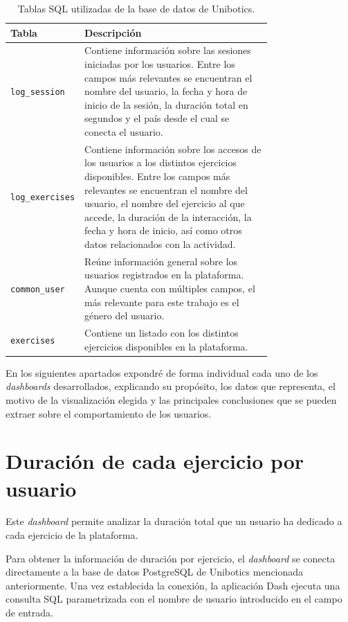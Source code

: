 \documentclass[a4paper, 12pt]{book}
\begin{document}
\begin{table}[!htb]
\centering
\caption{Tablas SQL utilizadas de la base de datos de Unibotics.}
\label{tbl:sql-tables}
\begin{tabular}{lp{0.75\linewidth}}
\toprule
\textbf{Tabla} & \textbf{Descripción} \\
\midrule
\texttt{log\_session} & Contiene información sobre las sesiones iniciadas por los usuarios. Entre los campos más relevantes se encuentran el nombre del usuario, la fecha y hora de inicio de la sesión, la duración total en segundos y el país desde el cual se conecta el usuario. \\
\texttt{log\_exercises} & Contiene información sobre los accesos de los usuarios a los distintos ejercicios disponibles. Entre los campos más relevantes se encuentran el nombre del usuario, el nombre del ejercicio al que accede, la duración de la interacción, la fecha y hora de inicio, así como otros datos relacionados con la actividad. \\
\texttt{common\_user} & Reúne información general sobre los usuarios registrados en la plataforma. Aunque cuenta con múltiples campos, el más relevante para este trabajo es el género del usuario. \\
\texttt{exercises} & Contiene un listado con los distintos ejercicios disponibles en la plataforma. \\
\bottomrule
\end{tabular}
\vspace{1ex}
\end{table}

En los siguientes apartados expondré de forma individual cada uno de los \textit{dashboards} desarrollados, explicando su propósito, los datos que representa, el motivo de la visualización elegida y las principales conclusiones que se pueden extraer sobre el comportamiento de los usuarios.

\section{Duración de cada ejercicio por usuario}
\label{sec:dash1a}

Este \textit{dashboard} permite analizar la duración total que un usuario ha dedicado a cada ejercicio de la plataforma.

Para obtener la información de duración por ejercicio, el \textit{dashboard} se conecta directamente a la base de datos PostgreSQL de Unibotics mencionada anteriormente. Una vez establecida la conexión, la aplicación Dash ejecuta una consulta SQL parametrizada con el nombre de usuario introducido en el campo de entrada.
\end{document}
